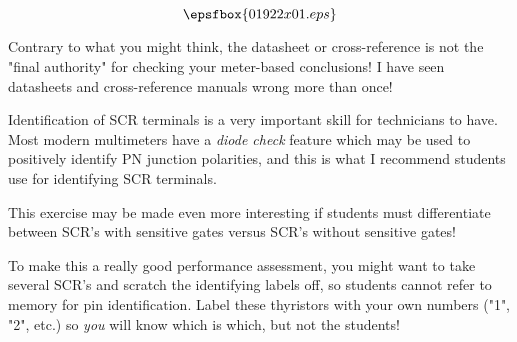 

$$\epsfbox{01922x01.eps}$$

\vfil \eject






Contrary to what you might think, the datasheet or cross-reference is not the "final authority" for checking your meter-based conclusions!  I have seen datasheets and cross-reference manuals wrong more than once!







Identification of SCR terminals is a very important skill for technicians to have.  Most modern multimeters have a {\it diode check} feature which may be used to positively identify PN junction polarities, and this is what I recommend students use for identifying SCR terminals.

This exercise may be made even more interesting if students must differentiate between SCR's with sensitive gates versus SCR's without sensitive gates!

To make this a really good performance assessment, you might want to take several SCR's and scratch the identifying labels off, so students cannot refer to memory for pin identification.  Label these thyristors with your own numbers ("1", "2", etc.) so {\it you} will know which is which, but not the students!





